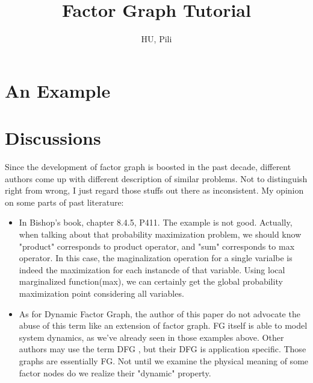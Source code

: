 \documentclass[11pt,a4paper]{article}
\author{HU, Pili}
\title{Factor Graph Tutorial}
\begin{document}
\maketitle

\begin{abstract}
	
\end{abstract}

\pagebreak
\tableofcontents
\pagebreak

\section{An Example}

\section{Discussions}

Since the development of factor graph is boosted in the past decade, 
different authors come up with different description of similar problems. 
Not to distinguish right from wrong, I just regard those stuffs out there
as inconsistent. My opinion on some parts of past literature:
\begin{itemize}
	\item In Bishop's book\cite{bishop2006pattern}, chapter 8.4.5, P411. 
	The example is not good. Actually, when talking about that probability 
	maximization problem, we should know "product" corresponds to product operator, 
	and "sum" corresponds to max operator. In this case, the maginalization 
	operation for a single varialbe is indeed the maximization for each 
	instancde of that variable. Using local marginalized function(max), we 
	can certainly get the global probability maximization point considering
	all variables. 
	\item As for Dynamic Factor Graph, the author of this paper do not advocate 
	the abuse of this term like an extension of factor graph. FG itself is able 
	to model system dynamics, as we've already seen in those examples above. 
	Other authors may use the term DFG
\cite{wang2011-dynamic}
\cite{mirowski2009dynamic}
	, but their DFG is application specific. 
	Those graphs are essentially FG. Not until we examine the physical meaning of 
	some factor nodes do we realize their "dynamic" property. 
\end{itemize}



\end{document}
